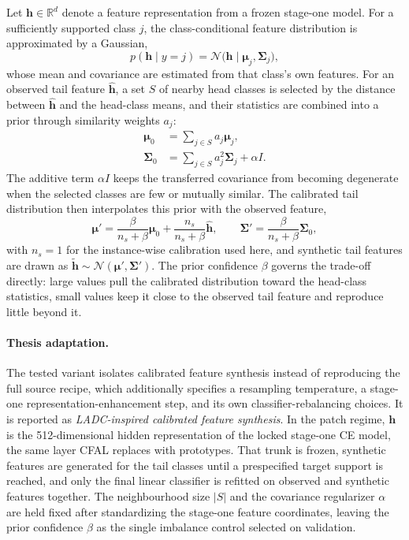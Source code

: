 \documentclass[11pt]{article}
\begin{document}
Let $\mathbf h\in\mathbb{R}^{d}$ denote a feature representation from a frozen stage-one model. For a sufficiently supported class $j$, the class-conditional feature distribution is approximated by a Gaussian,
\begin{equation}
  p(\mathbf h\mid y=j)=
  \mathcal{N}\bigl(\mathbf h\mid\boldsymbol\mu_j,\boldsymbol\Sigma_j\bigr),
  \label{eq:ladc-head-gaussian}
\end{equation}
\noindent whose mean and covariance are estimated from that class's own features. For an observed tail feature $\widehat{\mathbf h}$, a set $S$ of nearby head classes is selected by the distance between $\widehat{\mathbf h}$ and the head-class means, and their statistics are combined into a prior through similarity weights $a_j$:
\begin{align}
  \boldsymbol\mu_0&=\sum_{j\in S}a_j\boldsymbol\mu_j,
  \label{eq:ladc-prior-mean}\\
  \boldsymbol\Sigma_0&=\sum_{j\in S}a_j^{2}\boldsymbol\Sigma_j+\alpha I.
  \label{eq:ladc-prior-cov}
\end{align}
\noindent The additive term $\alpha I$ keeps the transferred covariance from becoming degenerate when the selected classes are few or mutually similar. The calibrated tail distribution then interpolates this prior with the observed feature,
\begin{equation}
  \boldsymbol\mu'=
  \frac{\beta}{n_s+\beta}\boldsymbol\mu_0+
  \frac{n_s}{n_s+\beta}\widehat{\mathbf h},
  \qquad
  \boldsymbol\Sigma'=\frac{\beta}{n_s+\beta}\boldsymbol\Sigma_0,
  \label{eq:ladc-posterior}
\end{equation}
\noindent with $n_s=1$ for the instance-wise calibration used here, and synthetic tail features are drawn as $\widetilde{\mathbf h}\sim\mathcal{N}(\boldsymbol\mu',\boldsymbol\Sigma')$. The prior confidence $\beta$ governs the trade-off directly: large values pull the calibrated distribution toward the head-class statistics, small values keep it close to the observed tail feature and reproduce little beyond it.

\paragraph{Thesis adaptation.}
The tested variant isolates calibrated feature synthesis instead of reproducing the full source recipe, which additionally specifies a resampling temperature, a stage-one representation-enhancement step, and its own classifier-rebalancing choices. It is reported as \emph{LADC-inspired calibrated feature synthesis}. In the patch regime, $\mathbf h$ is the \num{512}-dimensional hidden representation of the locked stage-one CE model, the same layer CFAL replaces with prototypes. That trunk is frozen, synthetic features are generated for the tail classes until a prespecified target support is reached, and only the final linear classifier is refitted on observed and synthetic features together. The neighbourhood size $|S|$ and the covariance regularizer $\alpha$ are held fixed after standardizing the stage-one feature coordinates, leaving the prior confidence $\beta$ as the single imbalance control selected on validation.
\end{document}
